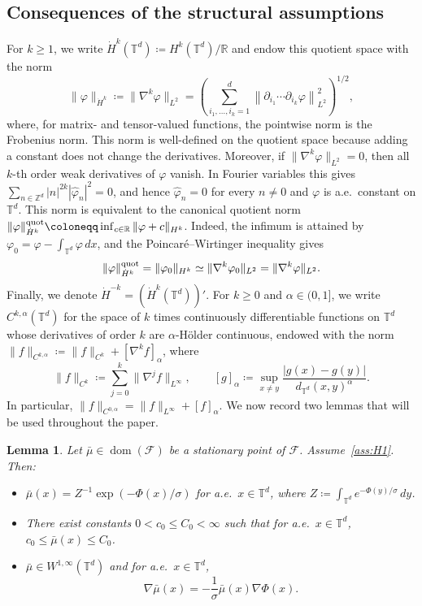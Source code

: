 \documentclass[11pt]{article}
\numberwithin{equation}{section}
\newtheorem{lemma}[theorem]{Lemma}
\theoremstyle{definition}
\newcommand{\R}{\mathbb{R}}
\newcommand{\T}{\mathbb{T}}
\newcommand{\F}{\mathcal{F}}
\newcommand{\dotHk}[1][k]{\dot{H}^{#1}}
\begin{document}
\subsection{Consequences of the structural assumptions}
\label{subsec:consequences-structural-assumptions}

For $k \ge 1$, we write $\dotHk(\T^d) \coloneqq H^k(\T^d)/\R$ and endow this quotient space with the norm
\[
\|\varphi\|_{\dotHk} \coloneqq \|\nabla^k \varphi\|_{L^2} = \left(\sum_{i_1,\ldots,i_k=1}^d \left\| \partial_{i_1} \cdots \partial_{i_k}\varphi \right\|_{L^2}^2\right)^{1/2},
\]
where, for matrix- and tensor-valued functions, the pointwise norm is the Frobenius norm.
This norm is well-defined on the quotient space because adding a constant does not change the derivatives.
Moreover, if $\|\nabla^k \varphi\|_{L^2} = 0$, then all $k$-th order weak derivatives of $\varphi$ vanish.
In Fourier variables this gives $\sum_{n \in \mathbb{Z}^d}|n|^{2k} |\widehat\varphi_n|^2 = 0$, and hence $\widehat\varphi_n = 0$ for every $n \neq 0$ and $\varphi$ is a.e.\ constant on $\T^d$.
This norm is equivalent to the canonical quotient norm $\|\varphi\|_{\dotHk}^{\rm quot}
\coloneqq \inf_{c \in \R} \|\varphi+c\|_{H^k}$.
Indeed, the infimum is attained by $\varphi_0 = \varphi - \int_{\T^d} \varphi \, dx$, and the Poincaré--Wirtinger inequality gives
\[
\|\varphi\|_{\dotHk}^{\rm quot} = \|\varphi_0\|_{H^k} \simeq \|\nabla^k \varphi_0\|_{L^2} = \|\nabla^k \varphi\|_{L^2}.
\]
Finally, we denote $\dot{H}^{-k} = (\dotHk[k](\T^d))'$.
For $k \ge 0$ and $\alpha \in (0,1]$, we write $C^{k,\alpha}(\T^d)$ for the space of $k$ times continuously differentiable functions on $\T^d$ whose derivatives of order $k$ are $\alpha$-Hölder continuous, endowed with the norm $\|f\|_{C^{k,\alpha}} \coloneqq \|f\|_{C^{k}} + [\nabla^k f]_\alpha$, where
\[
\|f\|_{C^{k}} \coloneqq \sum_{j=0}^{k} \|\nabla^j f\|_{L^\infty}, \qquad [g]_\alpha \coloneqq \sup_{x \neq y} \frac{|g(x)-g(y)|}{d_{\T^d}(x,y)^\alpha}.
\]
In particular, $\|f\|_{C^{0,\alpha}} = \|f\|_{L^\infty} + [f]_\alpha$.
We now record two lemmas that will be used throughout the paper.

\begin{lemma}
    \label{lem:mu_bar_bounds}
    Let $\bar\mu \in \operatorname{dom}(\F)$ be a stationary point of $\F$.
    Assume~\ref{ass:H1}.
    Then:
    \begin{itemize}
        \item[(i)] $\bar\mu(x) = Z^{-1}\exp(-\Phi(x)/\sigma)$ for a.e.\ $x\in\T^d$, where $Z \coloneqq \int_{\T^d} e^{-\Phi(y)/\sigma}\,dy$.
        \item[(ii)] There exist constants $0 < c_0 \le C_0 < \infty$ such that for a.e.\ $x \in \T^d$, $c_0 \le \bar\mu(x) \le C_0$.
        \item[(iii)] $\bar\mu\in W^{1,\infty}(\T^d)$ and for a.e.\ $x\in\T^d$,
        \begin{equation}
            \label{eq:derivative_barmu}
            \nabla\bar\mu(x) = -\frac{1}{\sigma} \bar\mu(x) \nabla\Phi(x). 
        \end{equation}
    \end{itemize}
\end{lemma}
\end{document}
